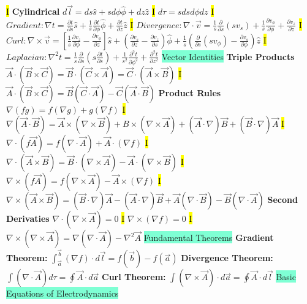 \documentclass[fontsize=4pt]{scrartcl}
\begin{document}
\hl{I}
\textbf{Cylindrical}
$d\vec{l} = ds \hat{s} + s d\phi \hat{\phi} + dz \hat{z}$
\hl{I}
$d\tau = s ds d\phi dz$
\hl{I}
$Gradient:  \nabla t =\frac{\partial t}{\partial s}\hat{s} + \frac{1}{s}\frac{\partial t}{\partial \phi}\hat{\phi} + \frac{\partial t}{\partial z}\hat{z} $
\hl{I}
$Divergence: \nabla \cdot \vec{v} = \frac{1}{s}\frac{\partial}{\partial s}(sv_s) + \frac{1}{s}\frac{\partial v_{\phi}}{\partial \phi} + \frac{\partial v_z}{\partial z}$
\hl{I}
$Curl: \nabla \times \vec{v} = [\frac{1}{s} \frac{\partial v_z}{\partial \phi} - \frac{\partial v_{\phi}}{\partial z}] \hat{s} + (\frac{\partial v_s}{\partial z} - \frac{\partial v_z}{\partial s}) \hat{\phi} + \frac{1}{s}(\frac{\partial}{\partial s} (sv_{\phi})- \frac{\partial v_s}{\partial \phi})\hat{z}$
\hl{I}
$Laplacian: \nabla^2 t = \frac{1}{s}\frac{\partial}{\partial s}(s\frac{\partial t}{\partial s}) + \frac{1}{s^2} \frac{\partial^2 t}{\partial \phi^2} + \frac{\partial^2 t}{\partial z^2}$
\colorbox{Aquamarine}{Vector Identities}
\textbf{Triple Products}
$\vec{A} \cdot (\vec{B} \times \vec{C}) = \vec{B} \cdot (\vec{C} \times \vec{A}) = \vec{C} \cdot (\vec{A} \times \vec{B})$
\hl{I}
$\vec{A} \cdot (\vec{B} \times \vec{C}) = \vec{B} ( \vec{C} \cdot \vec{A}) - \vec{C}(\vec{A} \cdot \vec{B})  $
\textbf{Product Rules}
$\nabla (fg) = f(\nabla g) + g (\nabla f)$
\hl{I}
$\nabla (\vec{A} \cdot \vec{B}) = \vec{A} \times (\nabla \times \vec{B}) + B \times (\nabla \times \vec{A}) + (\vec{A} \cdot \nabla)\vec{B} + (\vec{B} \cdot \nabla)\vec{A}$
\hl{I}
$\nabla \cdot (f \vec{A}) = f(\nabla \cdot \vec{A}) + \vec{A} \cdot (\nabla f)$
\hl{I}
$\nabla \cdot (\vec{A} \times \vec{B}) = \vec{B} \cdot (\nabla \times \vec{A}) - \vec{A} \cdot (\nabla \times \vec{B})$
\hl{I}
$\nabla \times (f \vec{A}) = f(\nabla \times \vec{A}) - \vec{A} \times (\nabla f)$
\hl{I}
$\nabla \times (\vec{A} \times \vec{B}) = (\vec{B} \cdot \nabla)\vec{A} - (\vec{A} \cdot \nabla)\vec{B} + \vec{A}(\nabla \cdot \vec{B}) - \vec{B}(\nabla \cdot \vec{A})$
\textbf{Second Derivaties}
$\nabla \cdot (\nabla \times \vec{A}) = 0$
\hl{I}
$\nabla \times (\nabla f) = 0$
\hl{I}
$\nabla \times (\nabla \times \vec{A}) = \nabla(\nabla \cdot \vec{A}) - \nabla^2 \vec{A}$
\colorbox{Aquamarine}{Fundamental Theorems}
\textbf{Gradient Theorem:}
$\int_{\vec{a}}^{\vec{b}} (\nabla f) \cdot d\vec{l} = f(\vec{b}) - f(\vec{a})$
\textbf{Divergence Theorem:} 
$\int (\nabla \cdot \vec{A}) d\tau = \oint \vec{A} \cdot d\vec{a}$
\textbf{Curl Theorem:}
$\int (\nabla \times \vec{A}) \cdot d\vec{a} = \oint \vec{A} \cdot d\vec{l}$
\colorbox{Aquamarine}{Basic Equations of Electrodynamics}
\end{document}
